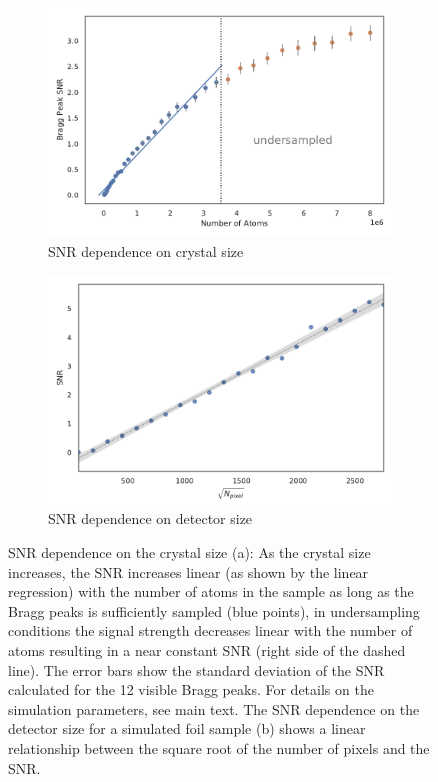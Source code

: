 \begin{figure}
	\centering
	\begin{subfigure}[b]{0.48\textwidth}
		\includegraphics[width=\linewidth]{images/SNRNatoms.pdf}
		\caption{ SNR dependence on crystal size}
		\label{fig:SNRNatoms}
	\end{subfigure}
	\begin{subfigure}[b]{0.48\textwidth}
		\includegraphics[width=\linewidth]{images/detsize.pdf}
		\caption{SNR dependence on detector size}
		\label{fig:SNRdetsize}
	\end{subfigure}
\caption[SNR dependence on crystal size and detector size]{SNR dependence on the crystal size (a): As the crystal size increases, the SNR increases linear (as shown by the linear regression) with the number of atoms in the sample as long as the Bragg peaks is sufficiently sampled (blue points), in undersampling conditions the signal strength decreases linear with the number of atoms resulting in a near constant SNR (right side of the dashed line). The error bars show the standard deviation of the SNR calculated for the 12 visible Bragg peaks. For details on the simulation parameters, see main text. The SNR dependence on the detector size for a simulated foil sample (b) shows a linear relationship between the square root of the number of pixels and the SNR.}

\end{figure}


